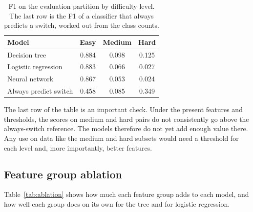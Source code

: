 \documentclass[runningheads]{llncs}
\newcommand{\tablefont}{\scriptsize\setlength{\tabcolsep}{3pt}}
\begin{document}
\begin{table}[t]
\centering
\caption{F1 on the evaluation partition by difficulty level. The last row is the F1 of a classifier that always predicts a switch, worked out from the class counts.}
\label{tab:diff}
\tablefont
\begin{tabular}{lccc}
\toprule
\textbf{Model} & \textbf{Easy} & \textbf{Medium} & \textbf{Hard} \\
\midrule
Decision tree       & 0.884 & 0.098 & 0.125 \\
Logistic regression & 0.883 & 0.066 & 0.027 \\
Neural network      & 0.867 & 0.053 & 0.024 \\
\midrule
Always predict switch & 0.458 & 0.085 & 0.349 \\
\bottomrule
\end{tabular}
\end{table}

The last row of the table is an important check. Under the present features and thresholds, the scores on medium and hard pairs do not consistently go above the always-switch reference. The models therefore do not yet add enough value there. Any use on data like the medium and hard subsets would need a threshold for each level and, more importantly, better features.

\subsection{Feature group ablation}

Table~\ref{tab:ablation} shows how much each feature group adds to each model, and how well each group does on its own for the tree and for logistic regression.
\end{document}
